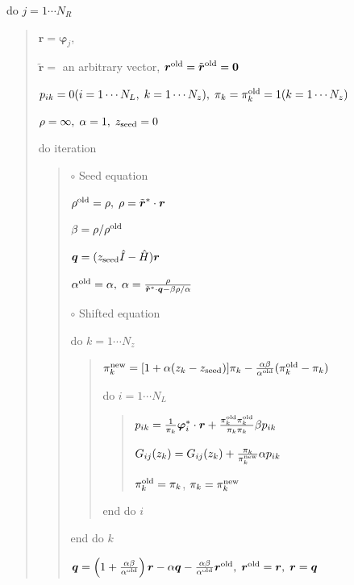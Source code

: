 \documentclass[letterpaper,10pt,dvipdfmx,openany]{sphinxmanual}
\begin{document}
do \(j = 1 \cdots N_R\)
\begin{quote}

\({\boldsymbol r} = {\boldsymbol \varphi_j}\),

\({\tilde {\boldsymbol r}} =\) an arbitrary vector,
\({\boldsymbol r}^{\rm old} = {\tilde {\boldsymbol r}}^{\rm old} = {\bf 0}\)

\(p_{i k} = 0(i=1 \cdots N_L,\; k=1 \cdots N_z),\; \pi_k=\pi_k^{\rm old} = 1(k=1 \cdots N_z)\)

\(\rho = \infty,\; \alpha = 1,\; z_{\rm seed}=0\)

do iteration
\begin{quote}

\(\circ\) Seed equation

\(\rho^{\rm old} = \rho,\; \rho = {\tilde {\boldsymbol r}}^* \cdot {\boldsymbol r}\)

\(\beta = \rho / \rho^{\rm old}\)

\({\boldsymbol q} = (z_{\rm seed} {\hat I} - {\hat H}){\boldsymbol r}\)

\(\alpha^{\rm old} = \alpha,\; \alpha = \frac{\rho}{{\tilde {\boldsymbol r}}^*\cdot{\boldsymbol q} - \beta \rho / \alpha }\)

\(\circ\) Shifted equation

do \(k = 1 \cdots N_z\)
\begin{quote}

\(\pi_k^{\rm new} = [1+\alpha(z_k-z_{\rm seed})]\pi_k - \frac{\alpha \beta}{\alpha^{\rm old}}(\pi_k^{\rm old} - \pi_k)\)

do \(i = 1 \cdots N_L\)
\begin{quote}

\(p_{i k} = \frac{1}{\pi_k} {\boldsymbol \varphi}_i^* \cdot {\boldsymbol r} + \frac{\pi^{\rm old}_k \pi^{\rm old}_k}{\pi_k \pi_k} \beta p_{i k}\)

\(G_{i j}(z_k) = G_{i j}(z_k) + \frac{\pi_k}{\pi_k^{\rm new}} \alpha p_{i k}\)

\(\pi_k^{\rm old} = \pi_k\), \(\pi_k = \pi_k^{\rm new}\)
\end{quote}

end do \(i\)
\end{quote}

end do \(k\)

\({\boldsymbol q} = \left( 1 + \frac{\alpha \beta}{\alpha^{\rm old}} \right) {\boldsymbol r} - \alpha {\boldsymbol q} - \frac{\alpha \beta}{\alpha^{\rm old}} {\boldsymbol r}^{\rm old},\; {\boldsymbol r}^{\rm old} = {\boldsymbol r},\; {\boldsymbol r} = {\boldsymbol q}\)


\end{quote}
\end{quote}
\end{document}

